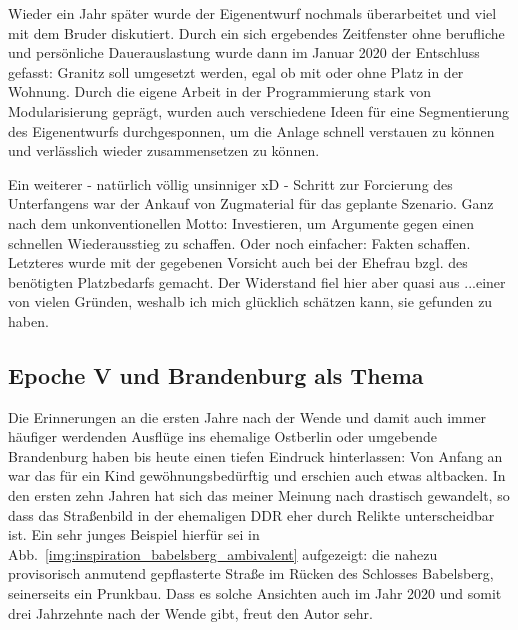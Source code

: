 Wieder ein Jahr sp\"ater wurde der Eigenentwurf nochmals \"uberarbeitet und viel mit dem Bruder diskutiert.
Durch ein sich ergebendes Zeitfenster ohne berufliche und pers\"onliche Dauerauslastung wurde dann im Januar 2020 der Entschluss gefasst:
Granitz soll umgesetzt werden, egal ob mit oder ohne Platz in der Wohnung.
Durch die eigene Arbeit in der Programmierung stark von Modularisierung gepr\"agt, wurden auch verschiedene Ideen f\"ur eine Segmentierung des Eigenentwurfs durchgesponnen, um die Anlage schnell verstauen zu k\"onnen und verl\"asslich wieder zusammensetzen zu k\"onnen.

Ein weiterer - nat\"urlich v\"ollig unsinniger xD - Schritt zur Forcierung des Unterfangens war der Ankauf von Zugmaterial f\"ur das geplante Szenario.
Ganz nach dem unkonventionellen Motto: Investieren, um Argumente gegen einen schnellen Wiederausstieg zu schaffen.
Oder noch einfacher: Fakten schaffen.
Letzteres wurde mit der gegebenen Vorsicht auch bei der Ehefrau bzgl. des ben\"otigten Platzbedarfs gemacht.
Der Widerstand fiel hier aber quasi aus ...einer von vielen Gr\"unden, weshalb ich mich gl\"ucklich sch\"atzen kann, sie gefunden zu haben.



\subsection{Epoche V und Brandenburg als Thema}
\label{sec:theme}

Die Erinnerungen an die ersten Jahre nach der Wende und damit auch immer h\"aufiger werdenden Ausfl\"uge ins ehemalige Ostberlin oder umgebende Brandenburg haben bis heute einen tiefen Eindruck hinterlassen:
Von Anfang an war das f\"ur ein Kind gew\"ohnungsbed\"urftig und erschien auch etwas altbacken.
In den ersten zehn Jahren hat sich das meiner Meinung nach drastisch gewandelt, so dass das Stra{\ss}enbild in der ehemaligen DDR eher durch Relikte unterscheidbar ist.
Ein sehr junges Beispiel hierf\"ur sei in Abb.~\ref{img:inspiration_babelsberg_ambivalent} aufgezeigt:
die nahezu provisorisch anmutend gepflasterte Stra{\ss}e im R\"ucken des Schlosses Babelsberg, seinerseits ein Prunkbau.
Dass es solche Ansichten auch im Jahr 2020 und somit drei Jahrzehnte nach der Wende gibt, freut den Autor sehr.

